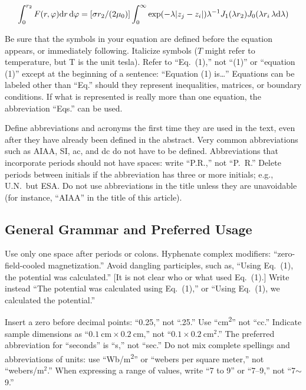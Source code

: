 \documentclass[conf]{new-aiaa}
\begin{document}
\begin{equation}
\label{sample:equation}
\int^{r_2}_0 F(r,\varphi){\rm d}r\,{\rm d}\varphi = [\sigma r_2/(2\mu_0)]\int^{\infty}_0\exp(-\lambda|z_j-z_i|)\lambda^{-1}J_1 (\lambda r_2)J_0 (\lambda r_i\,\lambda {\rm d}\lambda)
\end{equation}

Be sure that the symbols in your equation are defined before the equation appears, or immediately following. Italicize symbols ($T$ might refer to temperature, but T is the unit tesla). Refer to ``Eq.~(1),'' not ``(1)'' or ``equation (1)'' except at the beginning of a sentence: ``Equation (1) is\ldots'' Equations can be labeled other than ``Eq.'' should they represent inequalities, matrices, or boundary conditions. If what is represented is really more than one equation, the abbreviation ``Eqs.'' can be used.

Define abbreviations and acronyms the first time they are used in the text, even after they have already been defined in the abstract. Very common abbreviations such as AIAA, SI, ac, and dc do not have to be defined. Abbreviations that incorporate periods should not have spaces: write ``P.R.,'' not ``P.~R.'' Delete periods between initials if the abbreviation has three or more initials; e.g., U.N.~but ESA. Do not use abbreviations in the title unless they are unavoidable (for instance, ``AIAA'' in the title of this article).

\subsection{General Grammar and Preferred Usage}
Use only one space after periods or colons. Hyphenate complex modifiers: ``zero-field-cooled magnetization.'' Avoid dangling participles, such as, ``Using Eq.~(1), the potential was calculated.'' [It is not clear who or what used Eq.~(1).] Write instead ``The potential was calculated using Eq.~(1),'' or ``Using Eq.~(1), we calculated the potential.''

Insert a zero before decimal points: ``0.25,'' not ``.25.'' Use ``\si{\centi\meter\squared}'' not ``cc.'' Indicate sample dimensions as ``$\SI{0.1}{\centi\meter} \times \SI{0.2}{\centi\meter}$,'' not ``$0.1 \times \SI{0.2}{\centi\meter\squared}$.'' The preferred abbreviation for ``seconds'' is ``s,'' not ``sec.'' Do not mix complete spellings and abbreviations of units: use ``\si[per-mode=symbol]{\weber\per\meter\squared}'' or ``webers per square meter,'' not ``webers/m$^2$.'' When expressing a range of values, write ``7 to 9'' or ``7--9,'' not ``7$\sim$9.''
\end{document}
